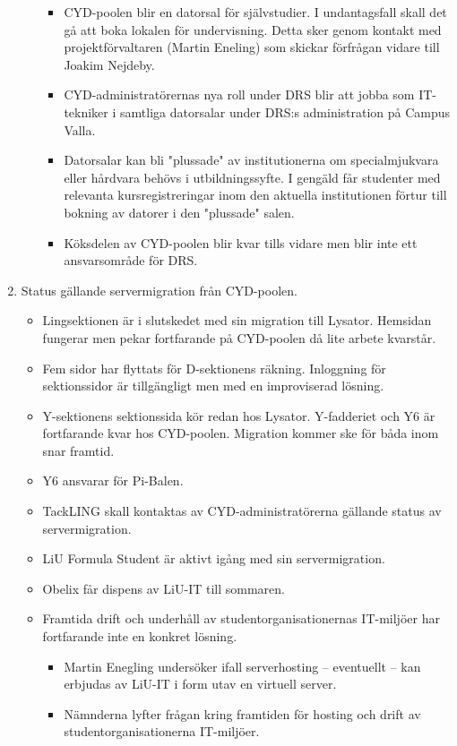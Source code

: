 \documentclass[a4paper,12pt]{article}
\begin{document}
\begin{enumerate}
\begin{itemize}
		\begin{itemize}
		\item CYD-poolen blir en datorsal för självstudier. I undantagsfall skall det gå att boka lokalen för undervisning. Detta sker genom kontakt med projektförvaltaren (Martin Eneling) som skickar förfrågan vidare till Joakim Nejdeby. 
		\item CYD-administratörernas nya roll under DRS blir att jobba som IT-tekniker i samtliga datorsalar under DRS:s administration på Campus Valla.
		\item Datorsalar kan bli "plussade" av institutionerna om specialmjukvara eller hårdvara behövs i utbildningssyfte. I gengäld får studenter med relevanta kursregistreringar inom den aktuella institutionen förtur till bokning av datorer i den "plussade" salen.
		\item Köksdelen av CYD-poolen blir kvar tills vidare men blir inte ett ansvarsområde för DRS.
		\end{itemize}
	\end{itemize}
\item Status gällande servermigration från CYD-poolen.
	\begin{itemize}
	\item Lingsektionen är i slutskedet med sin migration till Lysator. Hemsidan fungerar men pekar fortfarande på CYD-poolen då lite arbete kvarstår.
	\item Fem sidor har flyttats för D-sektionens räkning. Inloggning för sektionssidor är tillgängligt men med en improviserad lösning.
	\item Y-sektionens sektionssida kör redan hos Lysator. Y-fadderiet och Y6 är fortfarande kvar hos CYD-poolen. Migration kommer ske för båda inom snar framtid.
	\item Y6 ansvarar för Pi-Balen.
	\item TackLING skall kontaktas av CYD-administratörerna gällande status av servermigration.
	\item LiU Formula Student är aktivt igång med sin servermigration.
	\item Obelix får dispens av LiU-IT till sommaren.
	\item Framtida drift och underhåll av studentorganisationernas IT-miljöer har fortfarande inte en konkret lösning.
		\begin{itemize}
		\item Martin Enegling undersöker ifall serverhosting -- eventuellt -- kan erbjudas av LiU-IT i form utav en virtuell server.
		\item Nämnderna lyfter frågan kring framtiden för hosting och drift av studentorganisationerna IT-miljöer.

\end{itemize}
\end{itemize}
\end{enumerate}
\end{document}
